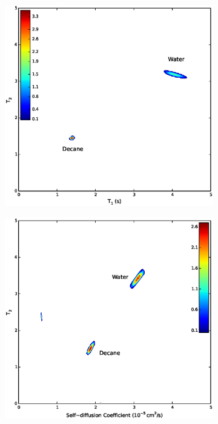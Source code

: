 \documentclass[PaulGanssle-Thesis.tex]{subfiles}
\begin{document}
\begin{figure}[h]
\centering
    \begin{subfigure}[t]{0.495\textwidth}
    \centering
    \includegraphics[width=\textwidth]{figures/relaxometry/decane-water-t1-t2.eps}
    \caption{}  
    \label{fig:DecaneWater-2D-T1T2-Data}
    \end{subfigure}
    \begin{subfigure}[t]{0.495\textwidth}
    \includegraphics[width=\textwidth]{figures/relaxometry/decane-water-t2-d.eps}

\end{subfigure}
\end{figure}
\end{document}
